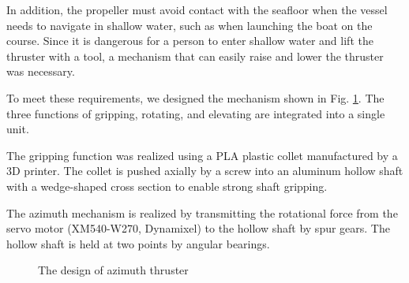 \documentclass[lettersize,journal]{IEEEtran}
\begin{document}
In addition, the propeller must avoid contact with the seafloor when the vessel needs to navigate in shallow water, such as when launching the boat on the course. Since it is dangerous for a person to enter shallow water and lift the thruster with a tool, a mechanism that can easily raise and lower the thruster was necessary.

To meet these requirements, we designed the mechanism shown in Fig. \ref{fig:azimuth_design}.
The three functions of gripping, rotating, and elevating are integrated into a single unit.

The gripping function was realized using a PLA plastic collet manufactured by a 3D printer.
The collet is pushed axially by a screw into an aluminum hollow shaft with a wedge-shaped cross section to enable strong shaft gripping.

The azimuth mechanism is realized by transmitting the rotational force from the servo motor (XM540-W270, Dynamixel) to the hollow shaft by spur gears.
The hollow shaft is held at two points by angular bearings.

\begin{figure}[htbp]
  \begin{center}
  \end{center}
  \caption{The design of azimuth thruster}
  \label{fig:azimuth_design}
\end{figure}
\end{document}
